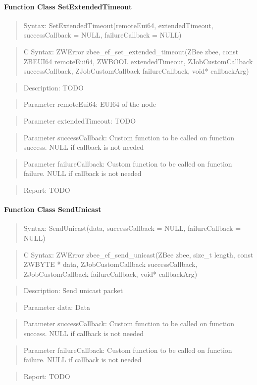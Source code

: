 \paragraph{Function Class SetExtendedTimeout}
\begin{quote}Syntax: SetExtendedTimeout(remoteEui64, extendedTimeout, successCallback = NULL, failureCallback = NULL)\end{quote}
\begin{quote}C Syntax: ZWError zbee\_ef\_set\_extended\_timeout(ZBee zbee, const ZBEUI64 remoteEui64, ZWBOOL extendedTimeout, ZJobCustomCallback successCallback, ZJobCustomCallback failureCallback, void* callbackArg)\end{quote}
\begin{quote}Description: TODO\end{quote}
\begin{quote}Parameter remoteEui64: EUI64 of the node\end{quote}
\begin{quote}Parameter extendedTimeout: TODO\end{quote}
\begin{quote}Parameter successCallback: Custom function to be called on function success. NULL if callback is not needed\end{quote}
\begin{quote}Parameter failureCallback: Custom function to be called on function failure. NULL if callback is not needed\end{quote}
\begin{quote}Report: TODO\end{quote}

\paragraph{Function Class SendUnicast}
\begin{quote}Syntax: SendUnicast(data, successCallback = NULL, failureCallback = NULL)\end{quote}
\begin{quote}C Syntax: ZWError zbee\_ef\_send\_unicast(ZBee zbee, size\_t length, const ZWBYTE * data, ZJobCustomCallback successCallback, ZJobCustomCallback failureCallback, void* callbackArg)\end{quote}
\begin{quote}Description: Send unicast packet\end{quote}
\begin{quote}Parameter data: Data\end{quote}
\begin{quote}Parameter successCallback: Custom function to be called on function success. NULL if callback is not needed\end{quote}
\begin{quote}Parameter failureCallback: Custom function to be called on function failure. NULL if callback is not needed\end{quote}
\begin{quote}Report: TODO\end{quote}

